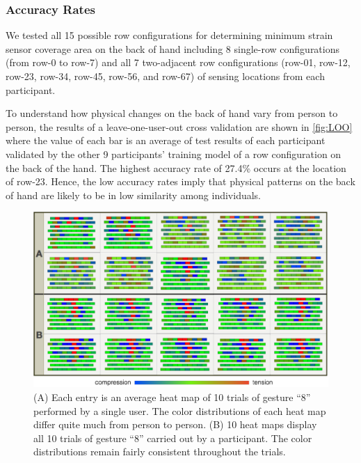 \documentclass{sigchi}
\begin{document}
\subsubsection{Accuracy Rates}
We tested all 15 possible row configurations for determining minimum strain sensor coverage area on the back of hand including 8 single-row configurations (from row-0 to row-7) and all 7 two-adjacent row configurations (row-01, row-12, row-23, row-34, row-45, row-56, and row-67) of sensing locations from each participant.

To understand how physical changes on the back of hand vary from person to person, the results of a leave-one-user-out cross validation are shown in \autoref{fig:LOO} where the value of each bar is an average of test results of each participant validated by the other 9 participants' training model of a row configuration on the back of the hand. The highest accuracy rate of 27.4\% occurs at the location of row-23. Hence, the low accuracy rates imply that physical patterns on the back of hand are likely to be in low similarity among individuals.

\begin{figure}[t]
 \begin{center}
  \includegraphics[width=1\columnwidth]{figures/SVisualNew_v3.pdf}
  \caption{
    (A) Each entry is an average heat map of 10 trials of gesture ``8'' performed by a single user. The color distributions of each heat map differ quite much from person to person.
    (B) 10 heat maps display all 10 trials of gesture ``8'' carried out by a participant. The color distributions remain fairly consistent throughout the trials.
  }
  \label{fig:SVisualNew}
  \end{center}
\end{figure}
\end{document}
